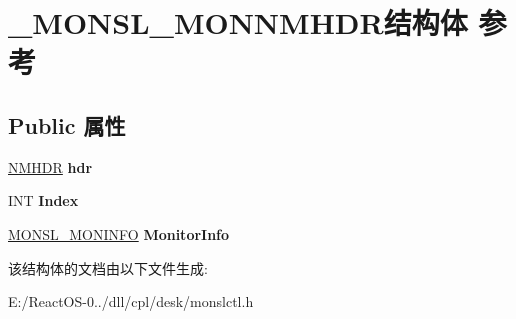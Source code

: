 \hypertarget{struct___m_o_n_s_l___m_o_n_n_m_h_d_r}{}\section{\+\_\+\+M\+O\+N\+S\+L\+\_\+\+M\+O\+N\+N\+M\+H\+D\+R结构体 参考}
\label{struct___m_o_n_s_l___m_o_n_n_m_h_d_r}
\subsection*{Public 属性}
\begin{DoxyCompactItemize}
\item 
\mbox{\label{struct___m_o_n_s_l___m_o_n_n_m_h_d_r_abfa68c07e0ee335b187f9aa9ccc4ea45}} 
\hyperlink{structtag_n_m_h_d_r}{N\+M\+H\+DR} {\bfseries hdr}
\item 
\mbox{\label{struct___m_o_n_s_l___m_o_n_n_m_h_d_r_a06669ef25517cce8bb5138b7761f7434}} 
I\+NT {\bfseries Index}
\item 
\mbox{\label{struct___m_o_n_s_l___m_o_n_n_m_h_d_r_aede6988f1a02040e07bfdbab43c22ce3}} 
\hyperlink{struct___m_o_n_s_l___m_o_n_i_n_f_o}{M\+O\+N\+S\+L\+\_\+\+M\+O\+N\+I\+N\+FO} {\bfseries Monitor\+Info}
\end{DoxyCompactItemize}


该结构体的文档由以下文件生成\+:\begin{DoxyCompactItemize}
\item 
E\+:/\+React\+O\+S-\/0../dll/cpl/desk/monslctl.\+h\end{DoxyCompactItemize}
